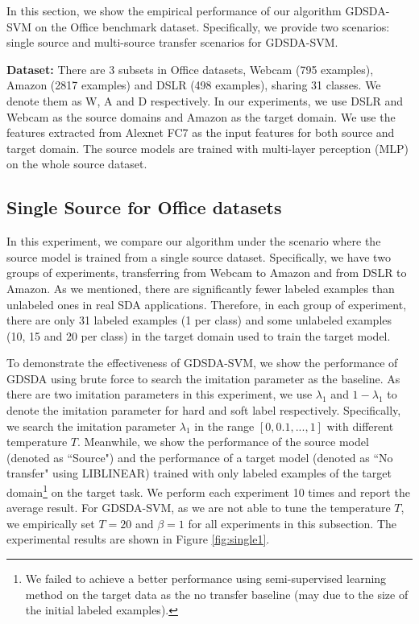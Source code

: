 In this section, we show the empirical performance of our algorithm GDSDA-SVM on the Office benchmark dataset. Specifically, we provide two scenarios: single source and multi-source transfer scenarios for GDSDA-SVM.

\textbf{Dataset:}
There are 3 subsets in Office datasets, Webcam (795 examples), Amazon (2817 examples) and DSLR (498 examples), sharing 31 classes. We denote them as W, A and D respectively. In our experiments, we use DSLR and Webcam as the source domains and Amazon as the target domain.
We use the features extracted from Alexnet \cite{KrizhevskyNIPS12} FC7 as the input features for both source and target domain. The source models are trained with multi-layer perception (MLP) on the whole source dataset. 

\subsection{Single Source for Office datasets}
In this experiment, we compare our algorithm under the scenario where the source model is trained from a single source dataset. Specifically, we have two groups of experiments, transferring from Webcam to Amazon and from DSLR to Amazon. As we mentioned, there are significantly fewer labeled examples than unlabeled ones in real SDA applications.
Therefore, in each group of experiment, there are only 31 labeled examples (1 per class) and some unlabeled examples (10, 15 and 20 per class) in the target domain used to train the target model.

To demonstrate the effectiveness of GDSDA-SVM, we show the performance of GDSDA using brute force to search the imitation parameter as the baseline. As there are two imitation parameters in this experiment, we use $\lambda_1$ and  $1-\lambda_1$ to denote the imitation parameter for hard and soft label respectively. Specifically, we search the imitation parameter $\lambda_1$ in the range $[0,0.1,...,1]$ with different temperature $T$. Meanwhile, we show the performance of the source model (denoted as ``Source") and the performance of a target model (denoted as ``No transfer" using LIBLINEAR\cite{fan2008liblinear}) trained with only labeled examples of the target domain\footnote{We failed to achieve a better performance using semi-supervised learning method \cite{delalleau2005efficient} on the target data as the no transfer baseline (may due to the size of the initial labeled examples).} on the target task. We perform each experiment 10 times and report the average result. For GDSDA-SVM, as we are not able to tune the temperature $T$, we empirically set $T=20$  and $\beta=1$ for all experiments in this subsection. The experimental results are shown in Figure \ref{fig:single1}. 

